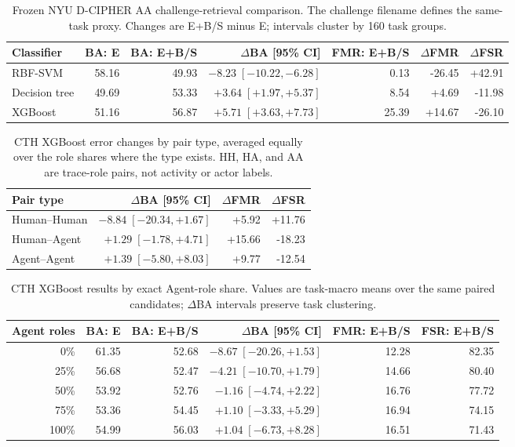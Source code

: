\begin{table}[ht]
\centering
\scriptsize\setlength{\tabcolsep}{2.5pt}\renewcommand{\arraystretch}{1.1}
\caption{Frozen NYU D-CIPHER AA challenge-retrieval comparison. The challenge filename defines the same-task proxy. Changes are E+B/S minus E; intervals cluster by 160 task groups.}
\label{tab:nyu-aa-confirmation}
\begin{tabular*}{\linewidth}{@{\extracolsep{\fill}}lrrrrrr@{}}
\toprule
Classifier & BA: E & BA: E+B/S & $\Delta$BA [95\% CI] & FMR: E+B/S & $\Delta$FMR & $\Delta$FSR \\ \midrule
RBF-SVM & 58.16 & 49.93 & $-8.23\;[-10.22,-6.28]$ & 0.13 & -26.45 & +42.91 \\
Decision tree & 49.69 & 53.33 & $+3.64\;[+1.97,+5.37]$ & 8.54 & +4.69 & -11.98 \\
XGBoost & 51.16 & 56.87 & $+5.71\;[+3.63,+7.73]$ & 25.39 & +14.67 & -26.10 \\
\bottomrule
\end{tabular*}
\end{table}

\begin{table}[ht]
\centering
\scriptsize\setlength{\tabcolsep}{3pt}\renewcommand{\arraystretch}{1.1}
\caption{CTH XGBoost error changes by pair type, averaged equally over the role shares where the type exists. HH, HA, and AA are trace-role pairs, not activity or actor labels.}
\label{tab:cth-pair-type-deltas}
\begin{tabular*}{\linewidth}{@{\extracolsep{\fill}}lrrr@{}}
\toprule
Pair type & $\Delta$BA [95\% CI] & $\Delta$FMR & $\Delta$FSR \\ \midrule
Human--Human & $-8.84\;[-20.34,+1.67]$ & +5.92 & +11.76 \\
Human--Agent & $+1.29\;[-1.78,+4.71]$ & +15.66 & -18.23 \\
Agent--Agent & $+1.39\;[-5.80,+8.03]$ & +9.77 & -12.54 \\
\bottomrule
\end{tabular*}
\end{table}

\begin{table}[ht]
\centering
\scriptsize\setlength{\tabcolsep}{2.6pt}\renewcommand{\arraystretch}{1.08}
\caption{CTH XGBoost results by exact Agent-role share. Values are task-macro means over the same paired candidates; $\Delta$BA intervals preserve task clustering.}
\label{tab:cth-per-share-xgb}
\begin{tabular*}{\linewidth}{@{\extracolsep{\fill}}rrrrrr@{}}
\toprule
Agent roles & BA: E & BA: E+B/S & $\Delta$BA [95\% CI] & FMR: E+B/S & FSR: E+B/S \\ \midrule
0\% & 61.35 & 52.68 & $-8.67\;[-20.26,+1.53]$ & 12.28 & 82.35 \\
25\% & 56.68 & 52.47 & $-4.21\;[-10.70,+1.79]$ & 14.66 & 80.40 \\
50\% & 53.92 & 52.76 & $-1.16\;[-4.74,+2.22]$ & 16.76 & 77.72 \\
75\% & 53.36 & 54.45 & $+1.10\;[-3.33,+5.29]$ & 16.94 & 74.15 \\
100\% & 54.99 & 56.03 & $+1.04\;[-6.73,+8.28]$ & 16.51 & 71.43 \\
\bottomrule
\end{tabular*}
\end{table}
